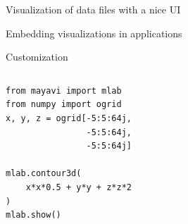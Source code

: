 \begin{frame}
    \Large
    \begin{center}
  Visualization of data files with a nice UI
    \end{center}
\end{frame}

\begin{frame}
    \Large
    \begin{center}
Embedding visualizations in applications
    \end{center}
\end{frame}

\begin{frame}
    \Large
    \begin{center}
        Customization
    \end{center}
\end{frame}

\begin{frame}
    \Huge
    \begin{center}
    \end{center}
\end{frame}


\begin{frame}
\end{frame}

\begin{frame}[fragile]
  \begin{columns}
    \hspace*{-0.45in}
      \footnotesize
\begin{lstlisting}
from mayavi import mlab
from numpy import ogrid
x, y, z = ogrid[-5:5:64j,
                -5:5:64j,
                -5:5:64j]

mlab.contour3d(
    x*x*0.5 + y*y + z*z*2
)
mlab.show()
\end{lstlisting}
    \hspace*{-0.1\linewidth}
  \end{columns}
\end{frame}

\begin{frame}[plain]
\end{frame}

